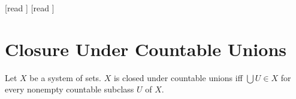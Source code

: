 \documentclass[10pt]{article}
\begin{document}
  \begin{imports}
    \begin{forthel}
      [read ]
      [read ]
    \end{forthel}
  \end{imports}


  \section*{Closure Under Countable Unions}

  \begin{forthel}
    \begin{definition}[id=FOUNDATIONS_14_2377279311183872,printid]
      Let $X$ be a system of sets.
      $X$ is closed under countable unions iff $\bigcup U \in X$ for every nonempty countable subclass $U$ of $ X$.
    \end{definition}
  \end{forthel}
\end{document}
